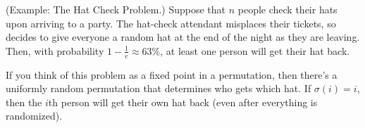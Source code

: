 \documentclass[letterpaper]{article}
\begin{document}
\begin{mdframed}[]
    (Example: The Hat Check Problem.) Suppose that $n$ people check their hats upon arriving to a party. The hat-check attendant misplaces their tickets, so decides to give everyone a random hat at the end of the night as they are leaving. Then, with probability $1 - \frac{1}{e} \approx 63\%$, at least one person will get their hat back. 

    \bigskip 

    If you think of this problem as a fixed point in a permutation, then there's a uniformly random permutation that determines who gets which hat. If $\sigma(i) = i$, then the $i$th person will get their own hat back (even after everything is randomized).
\end{mdframed}
\end{document}
